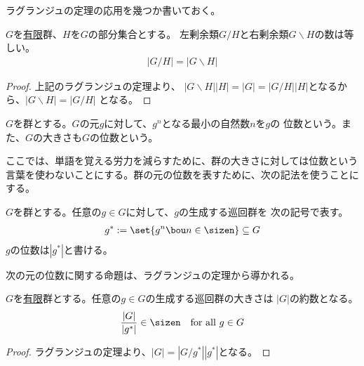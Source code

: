 	ラグランジュの定理の応用を幾つか書いておく。

	\begin{proposition}[有限群での左右剰余類]
	\label{prop:有限群での左右剰余類} %
		$G$を\underline{有限}群、$H$を$G$の部分集合とする。
		左剰余類$G/H$と右剰余類$G\backslash H$の数は等しい。
		\begin{equation*}\begin{split}
			|G/H| = |G\backslash H|
		\end{split}\end{equation*}
	\end{proposition} %
	\begin{proof} 上記のラグランジュの定理より、
	$|G\backslash H||H|=|G|=|G/H||H|$となるから、$|G\backslash H|=|G/H|$
	となる。
	\end{proof}

	\begin{definition}\label{def:群の位数} %
		$G$を群とする。$G$の元$g$に対して、$g^n$となる最小の自然数$n$を$g$の
		位数という。また、$G$の大きさも$G$の位数という。
	\end{definition} %

	ここでは、単語を覚える労力を減らすために、群の大きさに対しては位数という
	言葉を使わないことにする。群の元の位数を表すために、次の記法を使うことに
	する。

	\begin{definition}[部分巡回群]\label{def:部分巡回群} %
		$G$を群とする。任意の$g\in G$に対して、$g$の生成する巡回群を
		次の記号で表す。
		\begin{equation*}\begin{split}
			g^* := \set{g^n\bou n\in\sizen} \subseteq G
		\end{split}\end{equation*}
		$g$の位数は$|g^*|$と書ける。
	\end{definition} %

	次の元の位数に関する命題は、ラグランジュの定理から導かれる。

	\begin{proposition}[部分巡回群の大きさ]\label{prop:部分巡回群の大きさ} %
		$G$を\underline{有限}群とする。任意の$g\in G$の生成する巡回群の大きさは
		$|G|$の約数となる。
		\begin{equation*}\begin{split} %
			\frac{|G|}{|g^*|}\in\sizen \quad\text{for all }g\in G
		\end{split}\end{equation*} %
	\end{proposition} %
	\begin{proof} ラグランジュの定理より、$|G|=|G/g^*||g^*|$となる。
	\end{proof}

